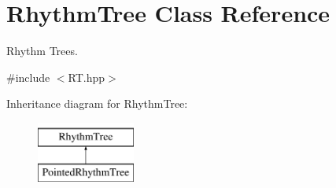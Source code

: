 \hypertarget{classRhythmTree}{}\section{Rhythm\+Tree Class Reference}
\label{classRhythmTree}


Rhythm Trees.  




{\ttfamily \#include $<$R\+T.\+hpp$>$}

Inheritance diagram for Rhythm\+Tree\+:\begin{figure}[H]
\begin{center}
\leavevmode
\includegraphics[height=2.000000cm]{classRhythmTree}
\end{center}
\end{figure}
